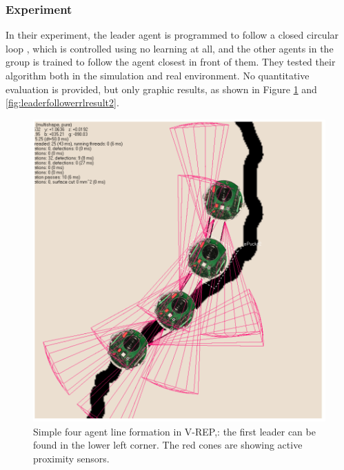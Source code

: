 \subsubsection{Experiment}

In their experiment, the leader agent is programmed to follow a closed circular loop , which is controlled using no learning at all, and the other agents in the group is trained to follow the agent closest in front of them.
They tested their algorithm both in the simulation and real environment.
No quantitative evaluation is provided, but only graphic results, as shown in Figure \ref{fig:leaderfollowerrlresult1} and \ref{fig:leaderfollowerrlresult2}.

\begin{figure}
	\centering
	\includegraphics[width=5in]{leaderfollowerrlresult1.png}
	\caption{Simple four agent line formation in V-REP,: the first leader can be found in the lower left corner. The red cones are showing active proximity sensors.}
	\label{fig:leaderfollowerrlresult1} 
\end{figure}

